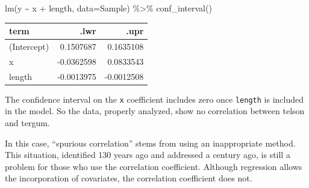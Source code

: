 \documentclass[
  letterpaper,
  DIV=11,
  numbers=noendperiod,
  oneside]{scrreprt}
\newenvironment{Shaded}{\begin{snugshade}}{\end{snugshade}}
\newcommand{\AttributeTok}[1]{\textcolor[rgb]{0.40,0.45,0.13}{#1}}
\newcommand{\FunctionTok}[1]{\textcolor[rgb]{0.28,0.35,0.67}{#1}}
\newcommand{\NormalTok}[1]{\textcolor[rgb]{0.00,0.23,0.31}{#1}}
\newcommand{\SpecialCharTok}[1]{\textcolor[rgb]{0.37,0.37,0.37}{#1}}
\begin{document}
\begin{Shaded}
\begin{Highlighting}[]
\FunctionTok{lm}\NormalTok{(y }\SpecialCharTok{\textasciitilde{}}\NormalTok{ x }\SpecialCharTok{+}\NormalTok{ length, }\AttributeTok{data=}\NormalTok{Sample) }\SpecialCharTok{\%\textgreater{}\%} \FunctionTok{conf\_interval}\NormalTok{()}
\end{Highlighting}
\end{Shaded}

\ttfamily 
\begin{tabular}{lrr}
\toprule
term & .lwr & .upr\\
\midrule
(Intercept) & 0.1507687 & 0.1635108\\
x & -0.0362598 & 0.0833543\\
length & -0.0013975 & -0.0012508\\
\bottomrule
\end{tabular} \normalfont
\bigskip

The confidence interval on the \texttt{x} coefficient includes zero once
\texttt{length} is included in the model. So the data, properly
analyzed, show no correlation between telson and tergum.

In this case, ``spurious correlation'' stems from using an inappropriate
method. This situation, identified 130 years ago and addressed a century
ago, is still a problem for those who use the correlation coefficient.
Although regression allows the incorporation of covariates, the
correlation coefficient does not.
\end{document}
